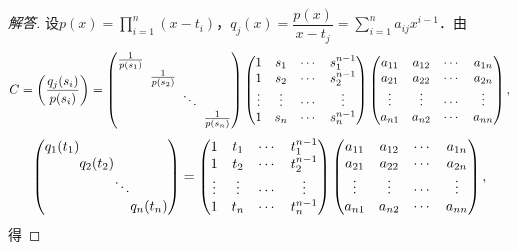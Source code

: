 \documentclass[a4paper,fontset=windows]{ctexbook}
\theoremstyle{definition}
\begin{document}
\begin{proof}[解答]
设$p(x)=\prod\limits_{i=1}^n(x-t_i)$，$q_j(x)=\dfrac{p(x)}{x-t_j}=\sum\limits_{i=1}^na_{ij}x^{i-1}$．由
$$C=\left(\frac{q_j(s_i)}{p(s_i)}\right)=\begin{pmatrix}\frac{1}{p(s_1)}&&& \\ &\hspace{-5pt}\frac{1}{p(s_2)}&& \\ &&\hspace{-5pt}\ddots& \\ &&&\hspace{-5pt}\frac{1}{p(s_n)}\end{pmatrix}\begin{pmatrix}1&s_1&\cdots&s_1^{n-1} \\ 1&s_2&\cdots&s_2^{n-1} \\ \vdots&\vdots&\cdots&\vdots \\ 1&s_n&\cdots&s_n^{n-1}\end{pmatrix}\begin{pmatrix}a_{11}&a_{12}&\cdots&a_{1n} \\ a_{21}&a_{22}&\cdots&a_{2n} \\ \vdots&\vdots&\cdots&\vdots \\ a_{n1}&a_{n2}&\cdots&a_{nn}\end{pmatrix},$$
$$\begin{pmatrix}q_1(t_1)&&& \\ &\hspace{-10pt}q_2(t_2)&& \\ &&\hspace{-10pt}\ddots& \\ &&&\hspace{-10pt}q_n(t_n)\end{pmatrix}=\begin{pmatrix}1&t_1&\cdots&t_1^{n-1} \\ 1&t_2&\cdots&t_2^{n-1} \\ \vdots&\vdots&\cdots&\vdots \\ 1&t_n&\cdots&t_n^{n-1}\end{pmatrix}\begin{pmatrix}a_{11}&a_{12}&\cdots&a_{1n} \\ a_{21}&a_{22}&\cdots&a_{2n} \\ \vdots&\vdots&\cdots&\vdots \\ a_{n1}&a_{n2}&\cdots&a_{nn}\end{pmatrix},$$
得

\end{proof}
\end{document}
